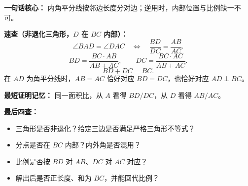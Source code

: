 \clearpage
\begin{summarybox}
\textbf{一句话核心：} 内角平分线按邻边长度分对边；逆用时，内部位置与比例缺一不可。

\textbf{速查（非退化三角形，$D$ 在 $BC$ 内部）：}
\[
 \angle BAD=\angle DAC
 \quad\Longleftrightarrow\quad
 \frac{BD}{DC}=\frac{AB}{AC}.
\]
\[
 BD=\frac{BC\cdot AB}{AB+AC},\qquad
 DC=\frac{BC\cdot AC}{AB+AC}.
\]
\[
 BD+DC=BC.
\]
在 $AD$ 为角平分线时，$AB=AC$ 恰好对应 $BD=DC$，也恰好对应 $AD\perp BC$。

\textbf{最短证明记忆：} 同一面积比，从 $A$ 看得 $BD/DC$，从 $D$ 看得 $AB/AC$。

\textbf{最后四查：}
\begin{itemize}[leftmargin=*]
\item 三角形是否非退化？给定三边是否满足严格三角形不等式？
\item 分点是否在 $BC$ 内部？内外角是否混用？
\item 比例是否按 $BD$ 对 $AB$、$DC$ 对 $AC$ 对应？
\item 解出后是否正长度、和为 $BC$，并能回代比例？
\end{itemize}
\end{summarybox}
